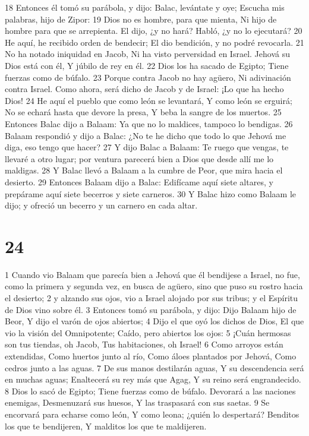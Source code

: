 18 Entonces él tomó su parábola, y dijo:
Balac, levántate y oye;
Escucha mis palabras, hijo de Zipor:
19 Dios no es hombre, para que mienta,
Ni hijo de hombre para que se arrepienta.
El dijo, ¿y no hará?
Habló, ¿y no lo ejecutará?
20 He aquí, he recibido orden de bendecir;
El dio bendición, y no podré revocarla.
21 No ha notado iniquidad en Jacob,
Ni ha visto perversidad en Israel.
Jehová su Dios está con él,
Y júbilo de rey en él.
22 Dios los ha sacado de Egipto;
Tiene fuerzas como de búfalo.
23 Porque contra Jacob no hay agüero,
Ni adivinación contra Israel.
Como ahora, será dicho de Jacob y de Israel:
¡Lo que ha hecho Dios!
24 He aquí el pueblo que como león se levantará,
Y como león se erguirá;
No se echará hasta que devore la presa,
Y beba la sangre de los muertos.
25 Entonces Balac dijo a Balaam: Ya que no lo maldices, tampoco lo bendigas.
26 Balaam respondió y dijo a Balac: ¿No te he dicho que todo lo que Jehová me diga, eso tengo que hacer?
27 Y dijo Balac a Balaam: Te ruego que vengas, te llevaré a otro lugar; por ventura parecerá bien a Dios que desde allí me lo maldigas.
28 Y Balac llevó a Balaam a la cumbre de Peor, que mira hacia el desierto.
29 Entonces Balaam dijo a Balac: Edifícame aquí siete altares, y prepárame aquí siete becerros y siete carneros.
30 Y Balac hizo como Balaam le dijo; y ofreció un becerro y un carnero en cada altar.

\chapter{24}

1 Cuando vio Balaam que parecía bien a Jehová que él bendijese a Israel, no fue, como la primera y segunda vez, en busca de agüero, sino que puso su rostro hacia el desierto;
2 y alzando sus ojos, vio a Israel alojado por sus tribus; y el Espíritu de Dios vino sobre él.
3 Entonces tomó su parábola, y dijo:
Dijo Balaam hijo de Beor,
Y dijo el varón de ojos abiertos;
4 Dijo el que oyó los dichos de Dios,
El que vio la visión del Omnipotente;
Caído, pero abiertos los ojos:
5 ¡Cuán hermosas son tus tiendas, oh Jacob,
Tus habitaciones, oh Israel! 
6 Como arroyos están extendidas,
Como huertos junto al río,
Como áloes plantados por Jehová,
Como cedros junto a las aguas.
7 De sus manos destilarán aguas,
Y su descendencia será en muchas aguas;
Enaltecerá su rey más que Agag,
Y su reino será engrandecido. 
8 Dios lo sacó de Egipto;
Tiene fuerzas como de búfalo.
Devorará a las naciones enemigas,
Desmenuzará sus huesos, 
Y las traspasará con sus saetas.
9 Se encorvará para echarse como león,
Y como leona; ¿quién lo despertará?
Benditos los que te bendijeren,
Y malditos los que te maldijeren.


